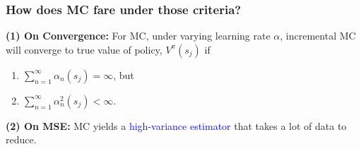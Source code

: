 \documentclass{article}
\begin{document}
\subsubsection{How does MC fare under those criteria?}
\textbf{(1) On Convergence:}
For MC, under varying learning rate $\alpha$, incremental MC will converge to true value of policy, $V^{\pi}(s_j)$ if 
\begin{enumerate}
\item $\sum_{n = 1}^{\infty} \alpha_n (s_j) = \infty$, but
\item $\sum_{n = 1}^{\infty} \alpha_n^{2} (s_j) < \infty$.
\end{enumerate}

\textbf{(2) On MSE:}
MC yields a \textcolor{blue}{high-variance estimator} that takes a lot of data to reduce.
\end{document}

